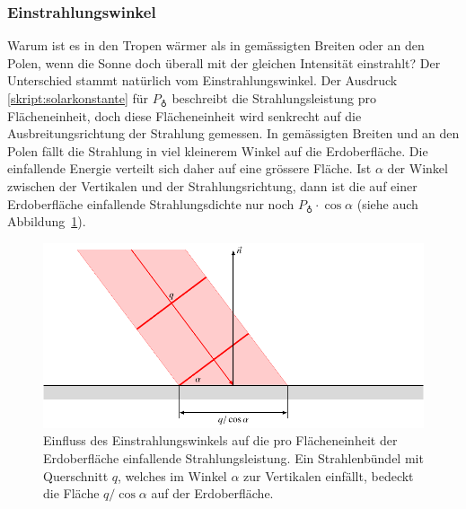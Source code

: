 \subsubsection{Einstrahlungswinkel}
Warum ist es in den Tropen wärmer als in gemässigten Breiten oder
an den Polen, wenn
die Sonne doch überall mit der gleichen Intensität einstrahlt?
Der Unterschied stammt natürlich vom Einstrahlungswinkel.
Der Ausdruck \eqref{skript:solarkonstante} für $P_{\earth}$ 
beschreibt die Strahlungsleistung pro Flächeneinheit, doch diese
Flächeneinheit wird senkrecht auf die Ausbreitungsrichtung der
Strahlung gemessen.
In gemässigten Breiten und an den Polen fällt die Strahlung 
in viel kleinerem Winkel auf die Erdoberfläche.
Die einfallende Energie verteilt sich daher auf eine grössere
Fläche.
Ist $\alpha$ der Winkel zwischen der Vertikalen und der Strahlungsrichtung,
dann ist die auf einer Erdoberfläche einfallende Strahlungsdichte nur
noch $P_{\earth}\cdot\cos\alpha$
(siehe auch Abbildung~\ref{skript:einfallswinkel}).

\begin{figure}
\centering
\includegraphics{chapters/1/einfall.pdf}
\caption{Einfluss des Einstrahlungswinkels auf die pro Flächeneinheit
der Erdoberfläche einfallende Strahlungsleistung.
Ein Strahlenbündel mit Querschnitt $q$, welches im Winkel
$\alpha$ zur Vertikalen einfällt, bedeckt die Fläche $q/\cos\alpha$
auf der Erdoberfläche.
\label{skript:einfallswinkel}}
\end{figure}

